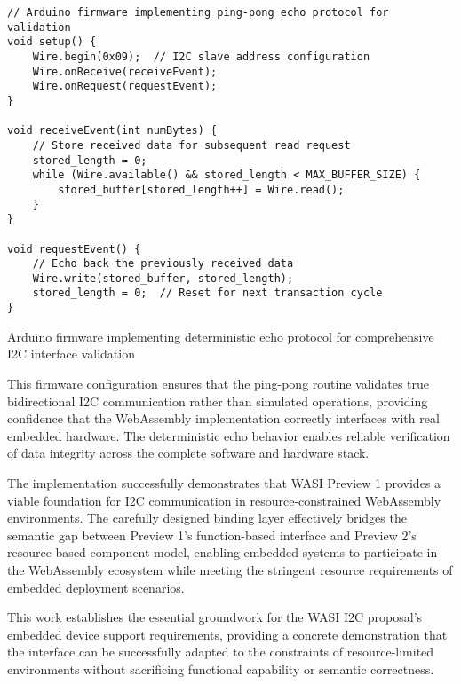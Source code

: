 \begin{listing}[H]
\begin{verbatim}
// Arduino firmware implementing ping-pong echo protocol for validation
void setup() {
    Wire.begin(0x09);  // I2C slave address configuration
    Wire.onReceive(receiveEvent);
    Wire.onRequest(requestEvent);
}

void receiveEvent(int numBytes) {
    // Store received data for subsequent read request
    stored_length = 0;
    while (Wire.available() && stored_length < MAX_BUFFER_SIZE) {
        stored_buffer[stored_length++] = Wire.read();
    }
}

void requestEvent() {
    // Echo back the previously received data
    Wire.write(stored_buffer, stored_length);
    stored_length = 0;  // Reset for next transaction cycle
}
\end{verbatim}
\caption{Arduino firmware implementing deterministic echo protocol for comprehensive I2C interface validation}
\label{lst:arduino-firmware}
\end{listing}

This firmware configuration ensures that the ping-pong routine validates true bidirectional I2C communication rather than simulated operations, providing confidence that the WebAssembly implementation correctly interfaces with real embedded hardware. The deterministic echo behavior enables reliable verification of data integrity across the complete software and hardware stack.

The implementation successfully demonstrates that WASI Preview 1 provides a viable foundation for I2C communication in resource-constrained WebAssembly environments. The carefully designed binding layer effectively bridges the semantic gap between Preview 1's function-based interface and Preview 2's resource-based component model, enabling embedded systems to participate in the WebAssembly ecosystem while meeting the stringent resource requirements of embedded deployment scenarios.

This work establishes the essential groundwork for the WASI I2C proposal's embedded device support requirements, providing a concrete demonstration that the interface can be successfully adapted to the constraints of resource-limited environments without sacrificing functional capability or semantic correctness.